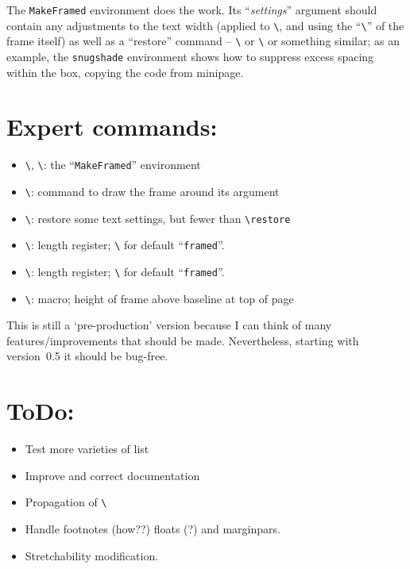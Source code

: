 \documentclass[DIV=8, pagesize=auto]{scrartcl}
\makeatletter
\newcommand*{\cs}[1]{\texttt{\textbackslash#1}}
\newcommand*{\cmd}[1]{\cs{\expandafter\@gobble\string#1}}
\newcommand*{\env}[1]{\texttt{#1}}
\newcommand*{\meta}[1]{\textlangle\textsl{#1}\textrangle}
\makeatother
\begin{document}
The \env{MakeFramed} environment does the work.  Its ``\meta{settings}'' argument
should contain any adjustments to the text width (applied to \cmd{\hsize},
and using the ``\cmd{\width}'' of the frame itself) as well as a ``restore''
command -- \cmd{\@parboxrestore} or \cmd{\FrameRestore} or something similar;
as an example, the \env{snugshade} environment shows how to suppress excess
spacing within the box, copying the code from minipage.


\section*{Expert commands:}

\begin{itemize}
\item \cmd{\MakeFramed}, \cmd{\endMakeFramed}: the ``\env{MakeFramed}'' environment
\item \cmd{\FrameCommand}: command to draw the frame around its argument
\item \cmd{\FrameRestore}: restore some text settings, but fewer than \cmd{\@parbox\-restore}
\item \cmd{\FrameRule}: length register; \cmd{\fboxrule} for default ``\env{framed}''.
\item \cmd{\FrameSep}: length register; \cmd{\fboxsep} for default ``\env{framed}''.
\item \cmd{\FrameHeightAdjust}: macro; height of frame above baseline at top of page
\end{itemize}

\medskip
This is still a `pre-production' version because I can think of many
features/improvements that should be made.  Nevertheless, starting 
with version~0.5 it should be bug-free.


\section*{ToDo:}

\begin{itemize}
\item Test more varieties of list 
\item Improve and correct documentation
\item Propagation of \cmd{\marks}
\item Handle footnotes (how??) floats (?) and marginpars.
\item Stretchability modification.
\end{itemize}
\end{document}
